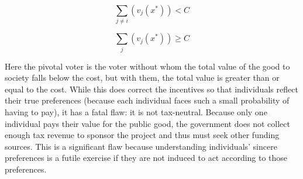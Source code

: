 \documentclass{amsart}
\theoremstyle{plain}
\begin{document}
\begin{equation*}
    \sum_{j \ne i}(v_j(x^*)) < C
\end{equation*}

\begin{equation*}
    \sum_{j}(v_j(x^*)) \ge C
\end{equation*}

Here the pivotal voter is the voter without whom the total value of the good to society falls below the cost, but with them, the total value is greater than or equal to the cost. While this does correct the incentives so that individuals reflect their true preferences (because each individual faces such a small probability of having to pay), it has a fatal flaw: it is not tax-neutral. Because only one individual pays their value for the public good, the government does not collect enough tax revenue to sponsor the project and thus must seek other funding sources. This is a significant flaw because understanding individuals' sincere preferences is a futile exercise if they are not induced to act according to those preferences.
\end{document}
